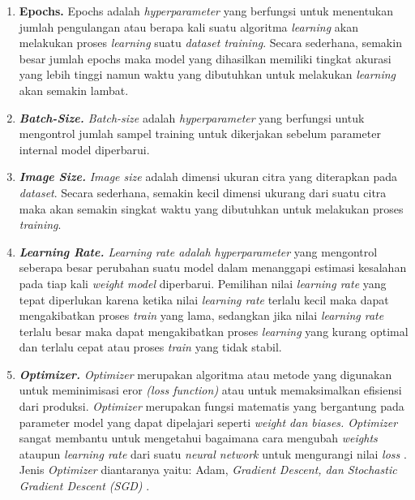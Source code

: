 \begin{enumerate}[nolistsep]
    \item \textbf{Epochs.} Epochs adalah \textit{hyperparameter} yang berfungsi untuk menentukan jumlah pengulangan atau berapa kali suatu algoritma \textit{learning} akan melakukan proses \textit{learning} suatu \textit{dataset training}. Secara sederhana, semakin besar jumlah epochs maka model yang dihasilkan memiliki tingkat akurasi yang lebih tinggi namun waktu yang dibutuhkan untuk melakukan \textit{learning} akan semakin lambat. 
    \item \textit{\textbf{Batch-Size.} Batch-size} adalah \textit{hyperparameter} yang berfungsi untuk mengontrol jumlah sampel training untuk dikerjakan sebelum parameter internal model diperbarui. 
    \item \textit{\textbf{Image Size.}} \textit{Image size} adalah dimensi ukuran citra yang diterapkan pada \textit{dataset}. Secara sederhana, semakin kecil dimensi ukurang dari suatu citra maka akan semakin singkat waktu yang dibutuhkan untuk melakukan proses \textit{training}.
    \item \textit{\textbf{Learning Rate.} Learning rate \textnormal{adalah} hyperparameter} yang mengontrol seberapa besar perubahan suatu model dalam menanggapi estimasi kesalahan pada tiap kali \textit{weight model} diperbarui. Pemilihan nilai \textit{learning rate} yang tepat diperlukan karena ketika nilai \textit{learning rate} terlalu kecil maka dapat mengakibatkan proses \textit{train} yang lama, sedangkan jika nilai \textit{learning rate} terlalu besar maka dapat mengakibatkan proses \textit{learning} yang kurang optimal dan terlalu cepat atau proses \textit{train} yang tidak stabil.
    \item \textit{\textbf{Optimizer.} Optimizer} merupakan algoritma atau metode yang digunakan untuk meminimisasi eror \textit{(loss function)} atau untuk memaksimalkan efisiensi dari produksi. \textit{Optimizer} merupakan fungsi matematis yang bergantung pada parameter model yang dapat dipelajari seperti \textit{weight \textnormal{dan} biases. Optimizer} sangat membantu untuk mengetahui bagaimana cara mengubah \textit{weights} ataupun \textit{learning rate} dari suatu \textit{neural network} untuk mengurangi nilai \textit{loss} \citep*{optimizerdl}. Jenis \textit{Optimizer} diantaranya yaitu: Adam, \textit{Gradient Descent, \textnormal{dan} Stochastic Gradient Descent (SGD)} \citep*{dlguideoptimizer}. 
\end{enumerate}

